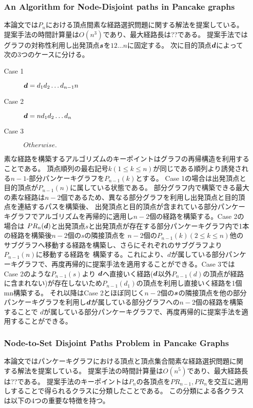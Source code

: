 \documentclass[11pt,a4j]{jsarticle}
\theoremstyle{plain}
\def\vector#1{\mbox{\boldmath $#1$}}
\begin{document}
\subsubsection{An Algorithm for Node-Disjoint paths in Pancake graphs}
本論文\cite{pan-n2n}では$P_n$における頂点間素な経路選択問題に関する解法を提案している。
提案手法の時間計算量は$O(n^3)$であり、最大経路長は??である。
提案手法ではグラフの対称性利用し出発頂点${\vector s}$を$12\dots n$に固定する。
次に目的頂点$\vector{d}$によって次の3つのケースに分ける。
\begin{description}
 \item[Case 1] $\vector{d} = d_1d_2\dots d_{n-1}n$
 \item[Case 2]  $\vector{d} = nd_1d_2\dots d_{n}$
 \item[Case 3]  $Otherwise.$
\end{description}
素な経路を構築するアルゴリズムのキーポイントはグラフの再帰構造を利用することである。
頂点順列の最右記号$k( 1 \leq k \leq n )$が同じである順列より誘発される$n-1$-部分パンケーキグラフを$P_{n-1}(k)$とする。
Case 1の場合は出発頂点と目的頂点が$P_{n-1}(n)$に属している状態である。
部分グラフ内で構築できる最大の素な経路は$n-2$個であるため、異なる部分グラフを利用し出発頂点と目的頂点を連結するパスを構築後、
出発頂点と目的頂点が含まれている部分パンケーキグラフでアルゴリズムを再帰的に適用し$n-2$個の経路を構築する。Case 2の場合は
$PR_n(\vector{d})$と出発頂点\vector {s}と出発頂点が存在する部分パンケーキグラフ内で1本の経路を構築後$n-2$個の\vector{s}の隣接頂点を
$n-2$個の$P_{n-1}(k) (2 \leq k \le n)$他のサブグラフへ移動する経路を構築し、さらにそれぞれのサブグラフより$P_{n-1}(n)$に移動する経路を
構築する。これにより、\vector{d}が属している部分パンケーキグラフで、再度再帰的に提案手法を適用することができる。Case 3では Case 2のような$P_{n-1}(s)$より
$\vector{d}$へ直接いく経路($\vector{d}$以外$P_{n-1}(d)$の頂点が経路に含まれない)が存在しないため$P_{n-1}(d_1)$の頂点を利用し直接いく経路を1個mn構築する。
それ以降はCase 2とほぼ同じく$n-2$個の$\vector{s}$の隣接頂点を他の部分パンケーキグラフを利用し$\vector{d}$が属している部分グラフへの$n-2$個の経路を構築することで
\vector{d}が属している部分パンケーキグラフで、再度再帰的に提案手法を適用することができる。

\subsubsection{Node-to-Set Disjoint Paths Problem in Pancake Graphs}
本論文\cite{pan-n2s}ではパンケーキグラフにおける頂点と頂点集合間素な経路選択問題に関する解法を提案している。
提案手法の時間計算量は$O(n^5)$であり、最大経路長は??である。
提案手法のキーポイントは$P_n$の各頂点を$PR_{n-1},PR_{n}$を交互に適用しすることで得られるクラスに分類したことである。
この分類による各クラスは以下の4つの重要な特徴を持つ。
\end{document}
